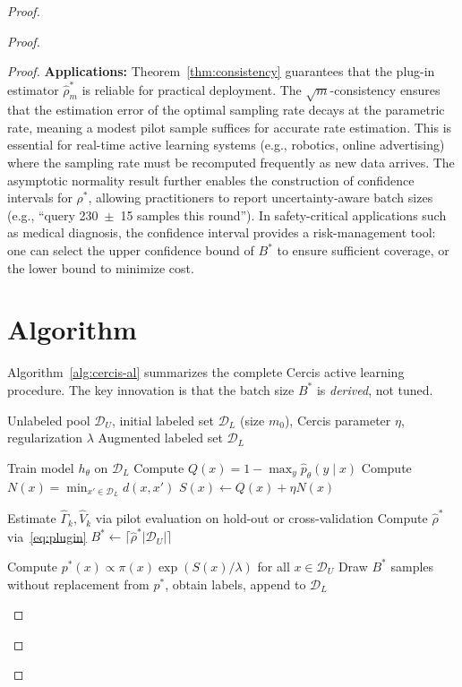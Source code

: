 \documentclass[12pt,a4paper]{article}
\newcommand{\cD}{\mathcal{D}}
\begin{document}
\begin{proof}
\begin{proof}
\begin{proof}
\medskip\noindent
\textbf{Applications:}
Theorem~\ref{thm:consistency} guarantees that the plug-in estimator
$\hat{\rho}^*_m$ is reliable for practical deployment.  The
$\sqrt{m}$-consistency ensures that the estimation error of the optimal
sampling rate decays at the parametric rate, meaning a modest pilot sample
suffices for accurate rate estimation.  This is essential for real-time active
learning systems (e.g., robotics, online advertising) where the sampling rate
must be recomputed frequently as new data arrives.  The asymptotic normality
result further enables the construction of confidence intervals for $\rho^*$,
allowing practitioners to report uncertainty-aware batch sizes (e.g.,
``query 230~$\pm$~15 samples this round'').  In safety-critical applications
such as medical diagnosis, the confidence interval provides a
risk-management tool: one can select the upper confidence bound of $B^*$
to ensure sufficient coverage, or the lower bound to minimize cost.

\section{Algorithm}

Algorithm~\ref{alg:cercis-al} summarizes the complete Cercis active learning
procedure.  The key innovation is that the batch size $B^*$ is
\emph{derived}, not tuned.

\begin{algorithm}[tb]
\caption{Cercis Optimal Active Learning (COAL)}
\label{alg:cercis-al}
\begin{algorithmic}[1]
\Require Unlabeled pool $\cD_U$, initial labeled set $\cD_L$ (size $m_0$),
         Cercis parameter $\eta$, regularization $\lambda$
\Ensure Augmented labeled set $\cD_L$

\State Train model $h_\theta$ on $\cD_L$
\For{$x\in\cD_U$}
    \State Compute $Q(x)=1-\max_y\hat{p}_\theta(y\mid x)$
    \State Compute $N(x)=\min_{x'\in\cD_L} d(x,x')$
    \State $S(x)\gets Q(x)+\eta N(x)$
\EndFor

\State Estimate $\widehat{\Gamma}_k,\widehat{V}_k$ via pilot evaluation
       on hold-out or cross-validation
\State Compute $\hat{\rho}^*$ via~\eqref{eq:plugin}
\State $B^* \gets \lceil\hat{\rho}^*|\cD_U|\rceil$

\State Compute $p^*(x)\propto\pi(x)\exp(S(x)/\lambda)$ for all $x\in\cD_U$
\State Draw $B^*$ samples without replacement from $p^*$, obtain labels,
       append to $\cD_L$


\end{algorithmic}
\end{algorithm}
\end{proof}
\end{proof}
\end{proof}
\end{document}
